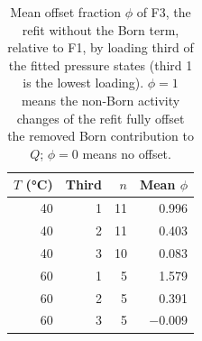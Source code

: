 \begin{table}[htb]
    \centering
    \caption{Mean offset fraction \(\phi\) of F3, the refit without the Born term, relative to F1, by loading third of the fitted pressure states (third 1 is the lowest loading).
    \(\phi=1\) means the non-Born activity changes of the refit fully offset the removed Born contribution to \(Q\); \(\phi=0\) means no offset.}
    \label{tab:s-phi}
    \begin{tabular}{@{}rrrr@{}}
        \toprule
        \(T\) (\si{\degreeCelsius}) & Third & \(n\) & Mean \(\phi\) \\
        \midrule
        40 & 1 & 11 & 0.996 \\
        40 & 2 & 11 & 0.403 \\
        40 & 3 & 10 & 0.083 \\
        60 & 1 & 5 & 1.579 \\
        60 & 2 & 5 & 0.391 \\
        60 & 3 & 5 & \(-\)0.009 \\
        \bottomrule
    \end{tabular}
\end{table}

